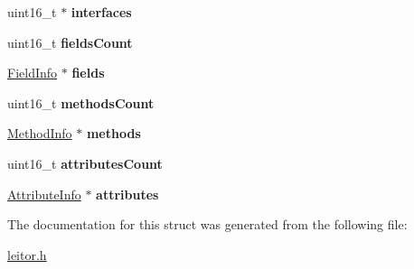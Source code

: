 \begin{DoxyCompactItemize}
\item 
\mbox{\label{structClassFile_a86680de028c6df386edafa8e8436b92c}} 
uint16\+\_\+t $\ast$ {\bfseries interfaces}
\item 
\mbox{\label{structClassFile_a87f4d2ede2eb9df54d69952df84226ca}} 
uint16\+\_\+t {\bfseries fields\+Count}
\item 
\mbox{\label{structClassFile_add171dc12613ad29ef94f4f18a50f06a}} 
\hyperlink{structFieldInfo}{Field\+Info} $\ast$ {\bfseries fields}
\item 
\mbox{\label{structClassFile_a24d224be2ab473bac3506890c6ff6a4d}} 
uint16\+\_\+t {\bfseries methods\+Count}
\item 
\mbox{\label{structClassFile_a67e02d50e6807bb97d7d8f265deef9a0}} 
\hyperlink{structMethodInfo}{Method\+Info} $\ast$ {\bfseries methods}
\item 
\mbox{\label{structClassFile_ad88c9b8262fbd79d49ad2c163ad45716}} 
uint16\+\_\+t {\bfseries attributes\+Count}
\item 
\mbox{\label{structClassFile_ad7db56de00dc682671cb8cfb837d92b7}} 
\hyperlink{structAttributeInfo}{Attribute\+Info} $\ast$ {\bfseries attributes}
\end{DoxyCompactItemize}


The documentation for this struct was generated from the following file\+:\begin{DoxyCompactItemize}
\item 
\hyperlink{leitor_8h}{leitor.\+h}\end{DoxyCompactItemize}
